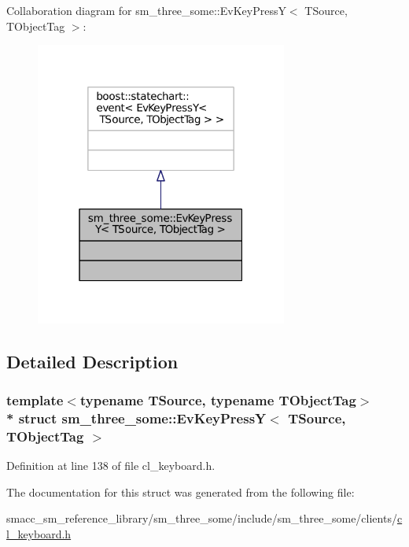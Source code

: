 Collaboration diagram for sm\+\_\+three\+\_\+some\+:\+:Ev\+Key\+PressY$<$ T\+Source, T\+Object\+Tag $>$\+:
\nopagebreak
\begin{figure}[H]
\begin{center}
\leavevmode
\includegraphics[width=235pt]{structsm__three__some_1_1EvKeyPressY__coll__graph}
\end{center}
\end{figure}


\subsection{Detailed Description}
\subsubsection*{template$<$typename T\+Source, typename T\+Object\+Tag$>$\\*
struct sm\+\_\+three\+\_\+some\+::\+Ev\+Key\+Press\+Y$<$ T\+Source, T\+Object\+Tag $>$}



Definition at line 138 of file cl\+\_\+keyboard.\+h.



The documentation for this struct was generated from the following file\+:\begin{DoxyCompactItemize}
\item 
smacc\+\_\+sm\+\_\+reference\+\_\+library/sm\+\_\+three\+\_\+some/include/sm\+\_\+three\+\_\+some/clients/\hyperlink{cl__keyboard_8h}{cl\+\_\+keyboard.\+h}\end{DoxyCompactItemize}
